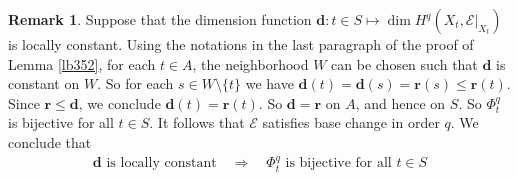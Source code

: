 \documentclass[12pt,b5paper,notitlepage]{report}
\theoremstyle{definition}
\newtheorem{rem}[df]{Remark}
\theoremstyle{plain}
\newcommand{\scr}{\mathscr}
\newcommand{\mbf}{\mathbf}
\numberwithin{equation}{section}
\begin{document}
\begin{rem}
Suppose that the dimension function $\mbf d:t\in S\mapsto \dim H^q(X_t,\scr E|_{X_t})$ is locally constant. Using the notations in the last paragraph of the proof of Lemma \ref{lb352}, for each $t\in A$, the neighborhood $W$ can be chosen such that $\mbf d$ is constant on $W$. So for each $s\in W\setminus\{t\}$ we have $\mbf d(t)=\mbf d(s)=\mbf r (s)\leq\mbf r(t)$. Since $\mbf r\leq\mbf d$, we conclude $\mbf d(t)=\mbf r(t)$. So $\mbf d=\mbf r$ on $A$, and hence on $S$. So $\Phi^q_t$ is bijective for all $t\in S$. It follows that $\scr E$ satisfies base change in order $q$. We conclude that
\begin{align}
\mbf d \text{ is locally constant}\quad\Longrightarrow\quad \Phi_t^q\text{ is bijective for all $t\in S$}   \label{eq184}
\end{align}
\end{rem}
\end{document}
